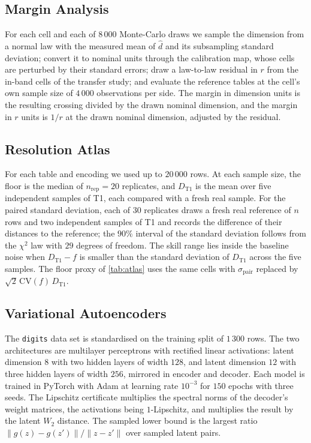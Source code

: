 \documentclass[twoside,11pt]{article}
\theoremstyle{plain}
\theoremstyle{definition}
\theoremstyle{remark}
\newcommand{\Wtwo}{\ensuremath{W_2}}
\newcommand{\dhat}{\ensuremath{\hat{d}}}
\begin{document}
\subsection{Margin Analysis}\label{app:details-margins}

For each cell and each of $8\,000$ Monte-Carlo draws we sample the
dimension from a normal law with the measured mean of $\dhat$ and its
subsampling standard deviation; convert it to nominal units through the
calibration map, whose cells are perturbed by their standard errors; draw a
law-to-law residual in $r$ from the in-band cells of the transfer study; and
evaluate the reference tables at the cell's own sample size of $4\,000$
observations per side. The margin in dimension units is the resulting
crossing divided by the drawn nominal dimension, and the margin in $r$ units
is $1/r$ at the drawn nominal dimension, adjusted by the residual.

\subsection{Resolution Atlas}\label{app:details-atlas}

For each table and encoding we used up to $20\,000$ rows. At each sample size, the floor is the median of $n_{\mathrm{rep}} = 20$ replicates, and $D_{\mathrm{T1}}$ is
the mean over five independent samples of T1, each compared with a fresh
real sample. For the paired standard deviation, each of $30$ replicates
draws a fresh real reference of $n$ rows and two independent samples of T1
and records the difference of their distances to the reference; the $90\%$
interval of the standard deviation follows from the $\chi^2$ law with $29$
degrees of freedom. The skill range lies inside the baseline noise when
$D_{\mathrm{T1}} - f$ is smaller than the standard deviation of
$D_{\mathrm{T1}}$ across the five samples. The floor proxy of
\cref{tab:atlas} uses the same cells with $\sigma_{\mathrm{pair}}$ replaced by
$\sqrt{2}\,\mathrm{CV}(f)\,D_{\mathrm{T1}}$.

\subsection{Variational Autoencoders}\label{app:details-vae}

The \texttt{digits} data set is standardised on the training split of
$1\,300$ rows. The two architectures are multilayer perceptrons with
rectified linear activations: latent dimension $8$ with two hidden layers of
width $128$, and latent dimension $12$ with three hidden layers of width
$256$, mirrored in encoder and decoder. Each model is trained in PyTorch
\citep{paszke2019} with Adam \citep{kingma2015} at learning rate $10^{-3}$
for $150$ epochs with three seeds. The Lipschitz
certificate multiplies the spectral norms of the decoder's weight matrices,
the activations being $1$-Lipschitz, and multiplies the result by the latent
$\Wtwo$ distance. The sampled lower bound is the largest ratio
$\|g(z) - g(z')\|/\|z - z'\|$ over sampled latent pairs.


\vskip 0.2in

\end{document}
